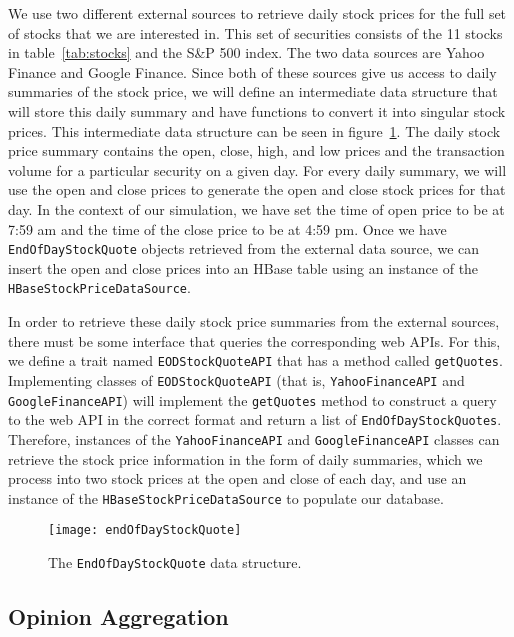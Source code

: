 We use two different external sources to retrieve daily stock prices for the full set of stocks that we are interested in. This set of securities consists of the 11 stocks in table~\ref{tab:stocks} and the S\&P 500 index. The two data sources are Yahoo Finance and Google Finance. Since both of these sources give us access to daily summaries of the stock price, we will define an intermediate data structure that will store this daily summary and have functions to convert it into singular stock prices. This intermediate data structure can be seen in figure~\ref{endOfDayStockQuote}. The daily stock price summary contains the open, close, high, and low prices and the transaction volume for a particular security on a given day. For every daily summary, we will use the open and close prices to generate the open and close stock prices for that day. In the context of our simulation, we have set the time of open price to be at 7:59 am and the time of the close price to be at 4:59 pm. Once we have \texttt{EndOfDayStockQuote} objects retrieved from the external data source, we can insert the open and close prices into an HBase table using an instance of the \texttt{HBaseStockPriceDataSource}.

In order to retrieve these daily stock price summaries from the external sources, there must be some interface that queries the corresponding web APIs. For this, we define a trait named \texttt{EODStockQuoteAPI} that has a method called \texttt{getQuotes}. Implementing classes of \texttt{EODStockQuoteAPI} (that is, \texttt{YahooFinanceAPI} and \texttt{GoogleFinanceAPI}) will implement the \texttt{getQuotes} method to construct a query to the web API in the correct format and return a list of \texttt{EndOfDayStockQuotes}. Therefore, instances of the \texttt{YahooFinanceAPI} and \texttt{GoogleFinanceAPI} classes can retrieve the stock price information in the form of daily summaries, which we process into two stock prices at the open and close of each day, and use an instance of the \texttt{HBaseStockPriceDataSource} to populate our database.

\begin{figure}[h]
  \label{endOfDayStockQuote}
  \begin{center}
    \texttt{[image: endOfDayStockQuote]}
  \end{center}
  \caption{The \texttt{EndOfDayStockQuote} data structure.}
\end{figure}

\subsection{Opinion Aggregation}


